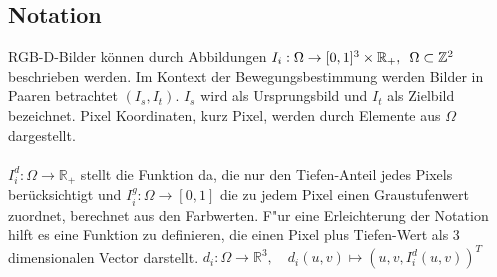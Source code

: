 \documentclass[12pt,DIV=15,BCOR=15mm,twoside,headsepline,abstract=true,listof=totoc,bibliography=totoc]{scrreprt}
\theoremstyle{remark}    %
\begin{document}
    \subsection{Notation}
    \ac{RGB-D}-Bilder können durch Abbildungen $I_i: \Omega \to [0,1]^3 \times \mathbb{R}_+, \hspace{0.5em}\Omega \subset \mathbb{Z}^2$ beschrieben werden. 
    Im Kontext der Bewegungsbestimmung werden Bilder in Paaren betrachtet $(I_s, I_t)$. $I_s$ wird als Ursprungsbild und $I_t$ als Zielbild bezeichnet. Pixel 
    Koordinaten, kurz Pixel, werden durch Elemente aus $\Omega$ dargestellt.\\\\
    $I_i^d: \Omega \to \mathbb{R}_+$ stellt die Funktion da, die nur den Tiefen-Anteil jedes Pixels berücksichtigt und 
    $I_i^g: \Omega \to [0,1]$ die zu jedem Pixel einen Graustufenwert zuordnet, berechnet aus den Farbwerten. F"ur eine Erleichterung der Notation hilft es eine 
    Funktion zu definieren, die einen Pixel plus Tiefen-Wert als 3 dimensionalen Vector darstellt.  $ d_i: \Omega \to \mathbb{R}^3,\hspace{1em} d_i(u,v) 
    \mapsto (u,v,I_i^d(u,v))^T$
\end{document}

